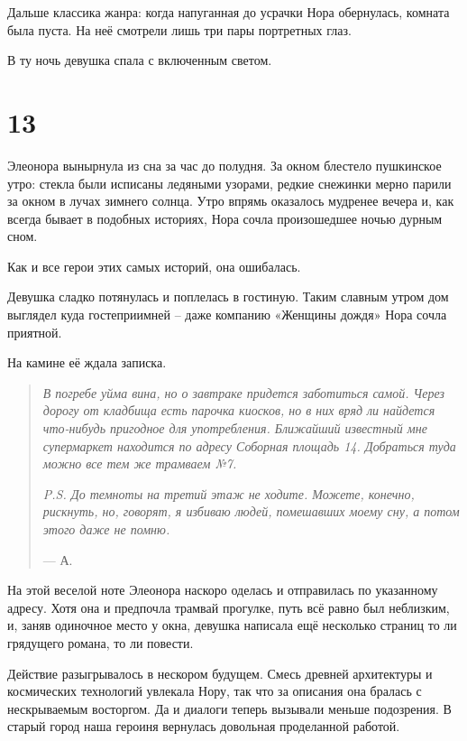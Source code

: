 \documentclass[
  a5paperpaper,
  DIV=11,
  numbers=noendperiod]{scrreprt}
\begin{document}
Дальше классика жанра: когда напуганная до усрачки Нора обернулась,
комната была пуста. На неё смотрели лишь три пары портретных глаз.

В ту ночь девушка спала с включенным светом.

\section*{13}\label{13}


Элеонора вынырнула из сна за час до полудня. За окном блестело
пушкинское утро: стекла были исписаны ледяными узорами, редкие снежинки
мерно парили за окном в лучах зимнего солнца. Утро впрямь оказалось
мудренее вечера и, как всегда бывает в подобных историях, Нора сочла
произошедшее ночью дурным сном.

Как и все герои этих самых историй, она ошибалась.

Девушка сладко потянулась и поплелась в гостиную. Таким славным утром
дом выглядел куда гостеприимней -- даже компанию «Женщины дождя» Нора
сочла приятной.

На камине её ждала записка.

\begin{quote}
\emph{В погребе уйма вина, но о завтраке придется заботиться самой.
Через дорогу от кладбища есть парочка киосков, но в них вряд ли найдется
что-нибудь пригодное для употребления. Ближайший известный мне
супермаркет находится по адресу Соборная площадь 14. Добраться туда
можно все тем же трамваем №7.}

\emph{P.S. До темноты на третий этаж не ходите. Можете, конечно,
рискнуть, но, говорят, я избиваю людей, помешавших моему сну, а потом
этого даже не помню.}

--- А.
\end{quote}

На этой веселой ноте Элеонора наскоро оделась и отправилась по
указанному адресу. Хотя она и предпочла трамвай прогулке, путь всё равно
был неблизким, и, заняв одиночное место у окна, девушка написала ещё
несколько страниц то ли грядущего романа, то ли повести.

Действие разыгрывалось в нескором будущем. Смесь древней архитектуры и
космических технологий увлекала Нору, так что за описания она бралась с
нескрываемым восторгом. Да и диалоги теперь вызывали меньше подозрения.
В старый город наша героиня вернулась довольная проделанной работой.
\end{document}
